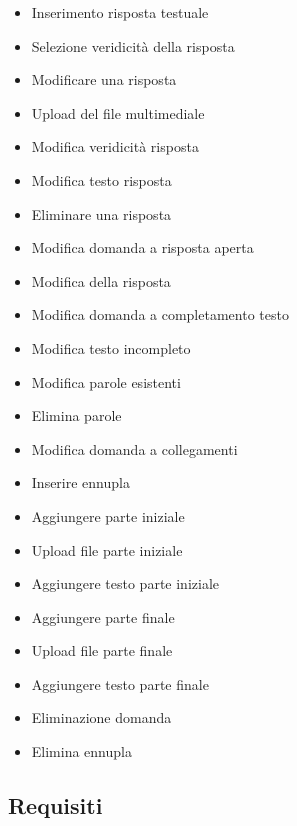 \begin{itemize}
	\item {} Inserimento risposta testuale
	\item {} Selezione veridicità della risposta
	\item {} Modificare una risposta
	\item {} Upload del file multimediale
	\item {} Modifica veridicità risposta
	\item {} Modifica testo risposta
	\item {} Eliminare una risposta
	\item {} Modifica domanda a risposta aperta 
	\item {} Modifica della risposta 
	\item {} Modifica domanda a completamento testo 
	\item {} Modifica testo incompleto
	\item {} Modifica parole esistenti
	\item {} Elimina parole
	\item {} Modifica domanda a collegamenti
	\item {} Inserire ennupla
	\item {} Aggiungere parte iniziale
	\item {} Upload file parte iniziale 
	\item {} Aggiungere testo parte iniziale
	\item {} Aggiungere parte finale 
	\item {} Upload file parte finale
	\item {} Aggiungere testo parte finale
	\item {} Eliminazione domanda
	\item {} Elimina ennupla
\end{itemize}

\subsection{Requisiti}
